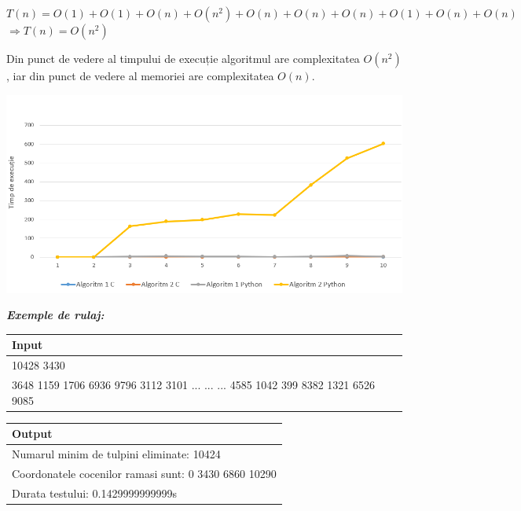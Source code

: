 \documentclass[11pt,a4paper]{article}
\begin{document}
$T(n) = O(1)+O(1)+O(n)+O(n^2)+O(n)+O(n)+O(n)+O(1)+O(n)+O(n)$ \\
$\Longrightarrow T(n)=O(n^2)$ 
 
Din punct de vedere al timpului de execuție algoritmul are complexitatea $O(n^2)$, iar din punct de vedere al memoriei are complexitatea $O(n)$. \\ 

\begin{center}
\includegraphics[width=1\textwidth]{diagrama2.png}
\end{center}

\textbf{\textit{Exemple de rulaj:}}

\setlength{\arrayrulewidth}{0.7mm}
\setlength{\tabcolsep}{5pt} 
\renewcommand{\arraystretch}{1}

\begin{table}[h!]
\centering
\begin{tabular}{ |p{13cm}|  }
\hline
\rowcolor{orange} \textbf{Input} \\
\hline
\rowcolor{LightCyan} 10428 3430 \\
\rowcolor{LightCyan} 3648 1159 1706 6936 9796 3112 3101 ... ... ... 4585 1042 399 8382 1321 6526 9085   \\
\hline
\end{tabular}
\end{table}

\vspace*{-\baselineskip}

\setlength{\arrayrulewidth}{0.7mm}
\setlength{\tabcolsep}{5pt}
\renewcommand{\arraystretch}{1}

\begin{table}[h!]
\centering

\begin{tabular}{ |p{13cm}|  }
\hline
\rowcolor{orange} \textbf{Output} \\
\hline
\rowcolor{LightCyan} Numarul minim de tulpini eliminate: 10424 \\ 
\rowcolor{LightCyan} Coordonatele cocenilor ramasi sunt: 0 3430 6860 10290  \\
\rowcolor{LightCyan}  Durata testului: 0.1429999999999s \\
\hline
\end{tabular}
\end{table}     
 
\end{document}
